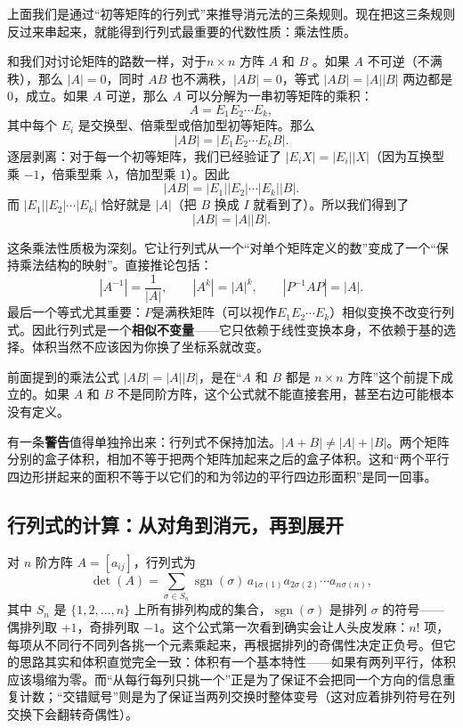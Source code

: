 \documentclass[UTF8]{ctexbook}
\begin{document}
上面我们是通过“初等矩阵的行列式”来推导消元法的三条规则。现在把这三条规则反过来串起来，就能得到行列式最重要的代数性质：乘法性质。

和我们对讨论矩阵的路数一样，对于$n\times n$ 方阵 $A$ 和 $B$ 。如果 $A$ 不可逆（不满秩），那么 $|A|=0$，同时 $AB$ 也不满秩，$|AB|=0$，等式 $|AB|=|A||B|$ 两边都是 $0$，成立。如果 $A$ 可逆，那么 $A$ 可以分解为一串初等矩阵的乘积：
\[
A=E_1E_2\cdots E_k,
\]
其中每个 $E_i$ 是交换型、倍乘型或倍加型初等矩阵。那么
\[
|AB|=|E_1E_2\cdots E_kB|.
\]
逐层剥离：对于每一个初等矩阵，我们已经验证了 $|E_iX|=|E_i||X|$（因为互换型乘 $-1$，倍乘型乘 $\lambda$，倍加型乘 $1$）。因此
\[
|AB|=|E_1||E_2|\cdots|E_k||B|.
\]
而 $|E_1||E_2|\cdots|E_k|$ 恰好就是 $|A|$（把 $B$ 换成 $I$ 就看到了）。所以我们得到了
\[
\boxed{|AB|=|A||B|}.
\]

这条乘法性质极为深刻。它让行列式从一个“对单个矩阵定义的数”变成了一个“保持乘法结构的映射”。直接推论包括：
\[
|A^{-1}|=\frac{1}{|A|},\qquad
|A^k|=|A|^k,\qquad
|P^{-1}AP|=|A|.
\]
最后一个等式尤其重要：$P$是满秩矩阵（可以视作$E_1E_2\cdots E_k$）相似变换不改变行列式。因此行列式是一个\textbf{相似不变量}——它只依赖于线性变换本身，不依赖于基的选择。体积当然不应该因为你换了坐标系就改变。


前面提到的乘法公式 $|AB|=|A||B|$，是在“$A$ 和 $B$ 都是 $n\times n$ 方阵”这个前提下成立的。如果 $A$ 和 $B$ 不是同阶方阵，这个公式就不能直接套用，甚至右边可能根本没有定义。

有一条\textbf{警告}值得单独拎出来：行列式不保持加法。$|A+B|\neq|A|+|B|$。两个矩阵分别的盒子体积，相加不等于把两个矩阵加起来之后的盒子体积。这和“两个平行四边形拼起来的面积不等于以它们的和为邻边的平行四边形面积”是同一回事。


\subsection{行列式的计算：从对角到消元，再到展开}


对 $n$ 阶方阵 $A=[a_{ij}]$，行列式为
\[
\det(A)=\sum_{\sigma\in S_n}
\operatorname{sgn}(\sigma)\,
a_{1\sigma(1)}a_{2\sigma(2)}\cdots a_{n\sigma(n)},
\]
其中 $S_n$ 是 $\{1,2,\dots,n\}$ 上所有排列构成的集合，$\operatorname{sgn}(\sigma)$ 是排列 $\sigma$ 的符号——偶排列取 $+1$，奇排列取 $-1$。这个公式第一次看到确实会让人头皮发麻：$n!$ 项，每项从不同行不同列各挑一个元素乘起来，再根据排列的奇偶性决定正负号。但它的思路其实和体积直觉完全一致：体积有一个基本特性——如果有两列平行，体积应该塌缩为零。而“从每行每列只挑一个”正是为了保证不会把同一个方向的信息重复计数；“交错赋号”则是为了保证当两列交换时整体变号（这对应着排列符号在列交换下会翻转奇偶性）。
\end{document}
